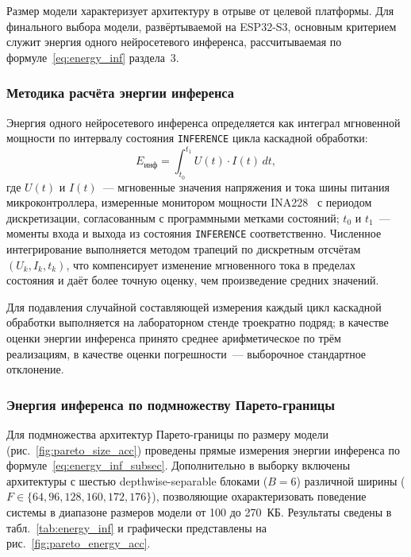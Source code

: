 Размер модели характеризует архитектуру в отрыве от целевой
платформы. Для финального выбора модели, развёртываемой на
ESP32-S3, основным критерием служит энергия одного нейросетевого
инференса, рассчитываемая по формуле~\eqref{eq:energy_inf}
раздела~3.

\subsubsection{Методика расчёта энергии инференса}

Энергия одного нейросетевого инференса определяется как
интеграл мгновенной мощности по интервалу состояния
\texttt{INFERENCE} цикла каскадной обработки:
\begin{equation}
	E_{\text{инф}} = \int_{t_0}^{t_1} U(t) \cdot I(t) \, dt,
	\label{eq:energy_inf_subsec}
\end{equation}
где $U(t)$ и $I(t)$~--- мгновенные значения напряжения и тока
шины питания микроконтроллера, измеренные монитором мощности
INA228~\cite{src:16} с периодом дискретизации, согласованным с
программными метками состояний; $t_0$ и $t_1$~--- моменты
входа и выхода из состояния \texttt{INFERENCE} соответственно.
Численное интегрирование выполняется методом трапеций по
дискретным отсчётам $(U_k, I_k, t_k)$, что компенсирует
изменение мгновенного тока в пределах состояния и даёт более
точную оценку, чем произведение средних значений.

Для подавления случайной составляющей измерения каждый цикл
каскадной обработки выполняется на лабораторном стенде
троекратно подряд; в качестве оценки энергии инференса принято
среднее арифметическое по трём реализациям, в качестве оценки
погрешности~--- выборочное стандартное отклонение.

\subsubsection{Энергия инференса по подмножеству Парето-границы}

Для подмножества архитектур Парето-границы по размеру модели
(рис.~\ref{fig:pareto_size_acc}) проведены прямые измерения
энергии инференса по формуле~\eqref{eq:energy_inf_subsec}.
Дополнительно в выборку включены архитектуры с шестью
depthwise-separable блоками ($B = 6$) различной ширины
($F \in \{64, 96, 128, 160, 172, 176\}$), позволяющие
охарактеризовать поведение системы в диапазоне размеров модели
от 100 до 270~КБ. Результаты сведены в
табл.~\ref{tab:energy_inf} и графически представлены на
рис.~\ref{fig:pareto_energy_acc}.

